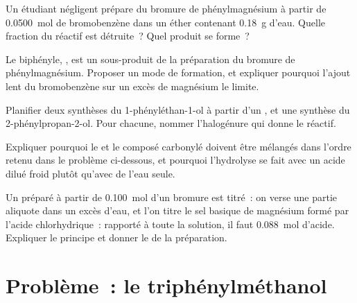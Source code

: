 \begin{exercise}[$\star\star$]\label{exo:b1:organomagnesium:8}
Un étudiant négligent prépare du bromure de phénylmagnésium à partir de
\qty{0.0500}{mol} de bromobenzène dans un éther contenant \qty{0.18}{g}
d'eau. Quelle fraction du réactif est détruite~? Quel produit se
forme~?
\end{exercise}

\begin{exercise}[$\star\star$]\label{exo:b1:organomagnesium:9}
Le biphényle, , est un sous-produit de la préparation du
bromure de phénylmagnésium. Proposer un mode de formation, et expliquer
pourquoi l'ajout lent du bromobenzène sur un excès de magnésium le
limite.
\end{exercise}

\begin{exercise}[$\star\star\star$]\label{exo:b1:organomagnesium:10}
Planifier deux synthèses du 1-phényléthan-1-ol à partir d'un , et une synthèse du 2-phénylpropan-2-ol. Pour chacune, nommer
l'halogénure qui donne le réactif.
\end{exercise}

\begin{exercise}[$\star\star\star$]\label{exo:b1:organomagnesium:11}
Expliquer pourquoi le  et le composé carbonylé
doivent être mélangés dans l'ordre retenu dans le problème ci-dessous,
et pourquoi l'hydrolyse se fait avec un acide dilué froid plutôt
qu'avec de l'eau seule.
\end{exercise}

\begin{exercise}[$\star\star\star$]\label{exo:b1:organomagnesium:12}
Un  préparé à partir de \qty{0.100}{mol} d'un
bromure est titré~: on verse une partie aliquote dans un excès d'eau, et
l'on titre le sel basique de magnésium formé par l'acide
chlorhydrique~: rapporté à toute la solution, il faut \qty{0.088}{mol}
d'acide. Expliquer le principe et donner le  de la
préparation.
\end{exercise}

\section{Problème~: le triphénylméthanol}

